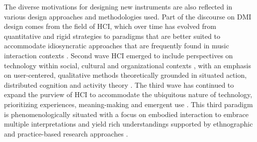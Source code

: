 \documentclass[letterpaper, 12pt]{article}
\begin{document}
The diverse motivations for designing new instruments are also reflected in various design approaches and methodologies used. Part of the discourse on DMI design comes from the field of HCI, which over time has evolved from quantitative and rigid strategies \citep{Bodker2015} to paradigms that are better suited to accommodate idiosyncratic approaches that are frequently found in music interaction contexts \citep{Wanderley2002}. Second wave HCI emerged to include perspectives on technology within social, cultural and organizational contexts \citep{kaptelinin2003}, with an emphasis on user-centered, qualitative methods theoretically grounded in situated action, distributed cognition and activity theory \citep{Bodker2006}. The third wave has continued to expand the purview of HCI to accommodate the ubiquitous nature of technology, prioritizing experiences, meaning-making and emergent use \citep{Bodker2015}. This third paradigm is phenomenologically situated with a focus on embodied interaction to embrace multiple interpretations and yield rich understandings \citep{Harrison2007} supported by ethnographic and practice-based research approaches \citep{Bodker2015}.


\end{document}
